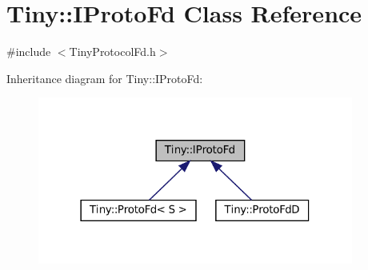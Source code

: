 \hypertarget{classTiny_1_1IProtoFd}{}\section{Tiny\+:\+:I\+Proto\+Fd Class Reference}
\label{classTiny_1_1IProtoFd}


{\ttfamily \#include $<$Tiny\+Protocol\+Fd.\+h$>$}



Inheritance diagram for Tiny\+:\+:I\+Proto\+Fd\+:
\nopagebreak
\begin{figure}[H]
\begin{center}
\leavevmode
\includegraphics[width=294pt]{classTiny_1_1IProtoFd__inherit__graph}
\end{center}
\end{figure}
